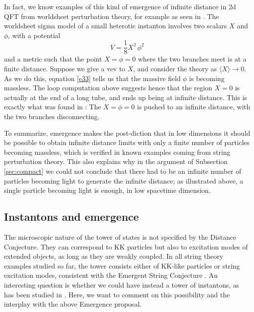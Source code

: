 \documentclass[11pt]{article}
\numberwithin{equation}{section}
\numberwithin{equation}{section}
\theoremstyle{remark}
\begin{document}
In fact, we know examples of this kind of emergence of infinite distance in 2d QFT from worldsheet perturbation theory, for example as seen in \cite{Witten:1994tz,Witten:1995zh}. The worldsheet sigma model of a small heterotic instanton involves two scalars $X$ and $\phi$, with a potential
\begin{equation} V=\frac18 X^2\, \phi^2\label{e33}\end{equation}
and a metric such that the point $X=\phi=0$ where the two branches meet is at a finite distance. Suppose we give a vev to $X$, and consider the theory as $\langle X \rangle\rightarrow0$. As we do this, equation \eqref{e33} tells us that the massive field $\phi$ is becoming massless. The loop computation above suggests hence that the region $X=0$ is actually at the end of a long tube, and ends up being at infinite distance. This is exactly what was found in \cite{Witten:1994tz}: The $X=\phi=0$ is pushed to an infinite distance, with the two branches disconnecting.

To summarize, emergence makes the post-diction that in low dimensions it should be possible to obtain infinite distance limits with only a finite number of particles becoming massless, which is verified in known examples coming from string perturbation theory. This also explains why in the argument of Subsection \ref{sec:compact} we could not conclude that there had to be an infinite number of particles becoming light to generate the infinite distance; as illustrated above, a single particle becoming light is enough, in low spacetime dimension.

\subsection{Instantons and emergence}  

The microscopic nature of the tower of states is not specified by the Distance Conjecture. They can correspond to KK particles but also to excitation modes of extended objects, as long as they are weakly coupled. In all string theory examples studied so far, the tower consists either of KK-like particles or string excitation modes, consistent with the Emergent String Conjecture \cite{Lee:2019wij}. An interesting question is whether we could have instead a tower of instantons, as has been studied in \cite{Marchesano:2019ifh,Baume:2019sry}. Here, we want to comment on this possibility and the interplay with the above Emergence proposal.
\end{document}
